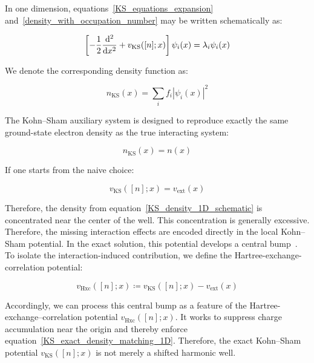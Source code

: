 In one dimension, equations~\eqref{KS_equations_expansion} and~\eqref{density_with_occupation_number} may be written schematically as:

\begin{equation}
    \left[-\frac{1}{2}\frac{\mathrm{d}^2}{\mathrm{d} x^2} + v_\mathrm{KS}([n];x)\right]\psi_i(x) = \lambda_i\psi_i(x)
\label{KS_equation_1D_schematic}
\end{equation}

We denote the corresponding density function as:

\begin{equation}
    n_\mathrm{KS}(x)=\sum_i f_i |\psi_i(x)|^2
\label{KS_density_1D_schematic}
\end{equation}

The Kohn--Sham auxiliary system is designed to reproduce exactly the same ground-state electron density as the true interacting system:

\begin{equation}
    n_\mathrm{KS}(x)=n(x)
\label{KS_exact_density_matching_1D}
\end{equation}

If one starts from the naive choice:

\begin{equation}
    v_\mathrm{KS}([n];x)=v_\mathrm{ext}(x)
\label{naive_KS_choice_external_only_1D}
\end{equation}

Therefore, the density from equation~\eqref{KS_density_1D_schematic} is concentrated near the center of the well.
This concentration is generally excessive.
Therefore, the missing interaction effects are encoded directly in the local Kohn--Sham potential.
In the exact solution, this potential develops a central bump~\cite{helbig2009exact}.
To isolate the interaction-induced contribution,
we define the Hartree-exchange-correlation potential:

\begin{equation}
    v_\mathrm{Hxc}([n];x)\coloneqq
    v_\mathrm{KS}([n];x)-v_\mathrm{ext}(x)
\label{Hxc_potential_definition_1D}
\end{equation}

Accordingly, we can process this central bump as a feature of the Hartree-exchange--correlation potential $v_\mathrm{Hxc}([n];x)$.
It works to suppress charge accumulation near the origin and thereby enforce equation~\eqref{KS_exact_density_matching_1D}.
Therefore, the exact Kohn--Sham potential $v_\mathrm{KS}([n];x)$ is not merely a shifted harmonic well.

